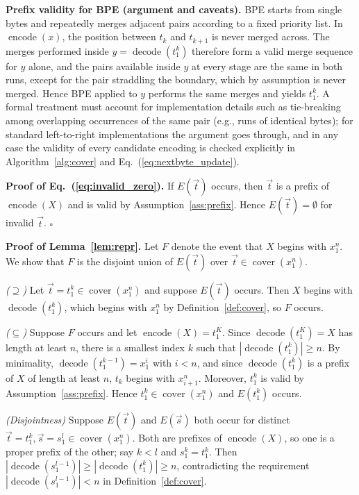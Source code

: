 \documentclass{article} %
\newcommand{\encf}{\operatorname{encode}}
\newcommand{\decf}{\operatorname{decode}}
\newcommand{\coverf}{\operatorname{cover}}
\begin{document}
\textbf{Prefix validity for BPE (argument and caveats).} BPE starts from single bytes and repeatedly merges adjacent pairs according to a fixed priority list. In $\encf(x)$, the position between $t_k$ and $t_{k+1}$ is never merged across. The merges performed inside $y=\decf(t_1^k)$ therefore form a valid merge sequence for $y$ alone, and the pairs available inside $y$ at every stage are the same in both runs, except for the pair straddling the boundary, which by assumption is never merged. Hence BPE applied to $y$ performs the same merges and yields $t_1^k$. A formal treatment must account for implementation details such as tie-breaking among overlapping occurrences of the same pair (e.g., runs of identical bytes); for standard left-to-right implementations the argument goes through, and in any case the validity of every candidate encoding is checked explicitly in Algorithm~\ref{alg:cover} and Eq.~(\ref{eq:nextbyte_update}).

\textbf{Proof of Eq.~(\ref{eq:invalid_zero}).} If $E(\vec{t})$ occurs, then $\vec{t}$ is a prefix of $\encf(X)$ and is valid by Assumption~\ref{ass:prefix}. Hence $E(\vec{t})=\emptyset$ for invalid $\vec{t}$. \hfill$\square$

\textbf{Proof of Lemma~\ref{lem:repr}.} Let $F$ denote the event that $X$ begins with $x_1^n$. We show that $F$ is the disjoint union of $E(\vec{t})$ over $\vec{t}\in\coverf(x_1^n)$.

\emph{($\supseteq$)} Let $\vec{t}=t_1^k\in\coverf(x_1^n)$ and suppose $E(\vec{t})$ occurs. Then $X$ begins with $\decf(t_1^k)$, which begins with $x_1^n$ by Definition~\ref{def:cover}, so $F$ occurs.

\emph{($\subseteq$)} Suppose $F$ occurs and let $\encf(X)=t_1^K$. Since $\decf(t_1^K)=X$ has length at least $n$, there is a smallest index $k$ such that $|\decf(t_1^k)|\ge n$. By minimality, $\decf(t_1^{k-1})=x_1^{i}$ with $i<n$, and since $\decf(t_1^k)$ is a prefix of $X$ of length at least $n$, $t_k$ begins with $x_{i+1}^n$. Moreover, $t_1^k$ is valid by Assumption~\ref{ass:prefix}. Hence $t_1^k\in\coverf(x_1^n)$ and $E(t_1^k)$ occurs.

\emph{(Disjointness)} Suppose $E(\vec{t})$ and $E(\vec{s})$ both occur for distinct $\vec{t}=t_1^k,\vec{s}=s_1^{l}\in\coverf(x_1^n)$. Both are prefixes of $\encf(X)$, so one is a proper prefix of the other; say $k<l$ and $s_1^k=t_1^k$. Then $|\decf(s_1^{l-1})|\ge|\decf(t_1^k)|\ge n$, contradicting the requirement $|\decf(s_1^{l-1})|<n$ in Definition~\ref{def:cover}.
\end{document}
